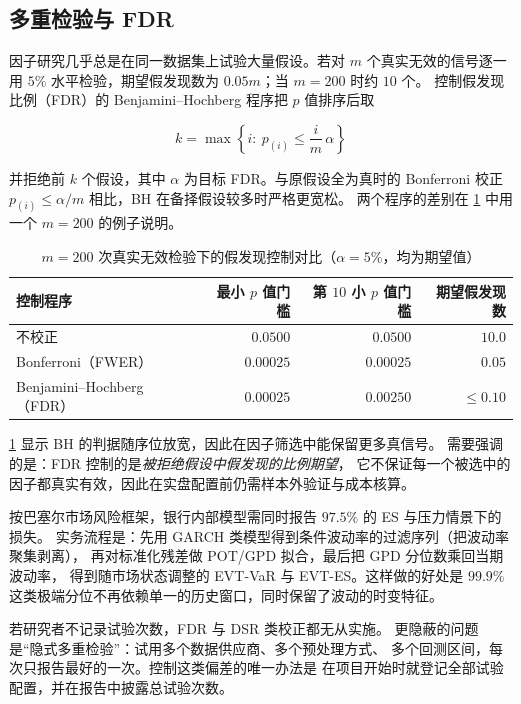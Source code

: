\subsection{多重检验与 FDR}

因子研究几乎总是在同一数据集上试验大量假设。若对 $m$ 个真实无效的信号逐一用
$5\%$ 水平检验，期望假发现数为 $0.05m$；当 $m = 200$ 时约 $10$ 个。
控制假发现比例（FDR）的 Benjamini--Hochberg 程序把 $p$ 值排序后取

\begin{equation}
  k = \max\left\{i:\ p_{(i)} \le \frac{i}{m}\,\alpha\right\}
  \label{eq:08-bh}
\end{equation}

并拒绝前 $k$ 个假设，其中 $\alpha$ 为目标 FDR。与原假设全为真时的 Bonferroni 校正
$p_{(i)} \le \alpha/m$ 相比，BH 在备择假设较多时严格更宽松。
两个程序的差别在 \cref{tab:08-multtest} 中用一个 $m = 200$ 的例子说明。

\begin{table}[htbp]
\centering
\caption{$m = 200$ 次真实无效检验下的假发现控制对比（$\alpha = 5\%$，均为期望值）}\label{tab:08-multtest}
\tablefont
\begin{tabular}{@{}lrrr@{}}
\toprule
控制程序 & 最小 $p$ 值门槛 & 第 $10$ 小 $p$ 值门槛 & 期望假发现数 \\
\midrule
不校正 & $0.0500$ & $0.0500$ & $10.0$ \\
Bonferroni（FWER） & $0.00025$ & $0.00025$ & $0.05$ \\
Benjamini--Hochberg（FDR） & $0.00025$ & $0.00250$ & $\le 0.10$ \\
\bottomrule
\end{tabular}
\end{table}

\cref{tab:08-multtest} 显示 BH 的判据随序位放宽，因此在因子筛选中能保留更多真信号。
需要强调的是：FDR 控制的是\emph{被拒绝假设中假发现的比例期望}，
它不保证每一个被选中的因子都真实有效，因此在实盘配置前仍需样本外验证与成本核算。

\begin{appbox}[极值理论在银行内部模型中的实际用法]
按巴塞尔市场风险框架，银行内部模型需同时报告 $97.5\%$ 的 ES 与压力情景下的损失。
实务流程是：先用 GARCH 类模型得到条件波动率的过滤序列（把波动率聚集剥离），
再对标准化残差做 POT/GPD 拟合，最后把 GPD 分位数乘回当期波动率，
得到随市场状态调整的 EVT-VaR 与 EVT-ES。这样做的好处是
$99.9\%$ 这类极端分位不再依赖单一的历史窗口，同时保留了波动的时变特征。
\end{appbox}

\begin{warningbox}[多重检验导致的假发现]
若研究者不记录试验次数，FDR 与 DSR 类校正都无从实施。
更隐蔽的问题是“隐式多重检验”：试用多个数据供应商、多个预处理方式、
多个回测区间，每次只报告最好的一次。控制这类偏差的唯一办法是
在项目开始时就登记全部试验配置，并在报告中披露总试验次数。
\end{warningbox}


